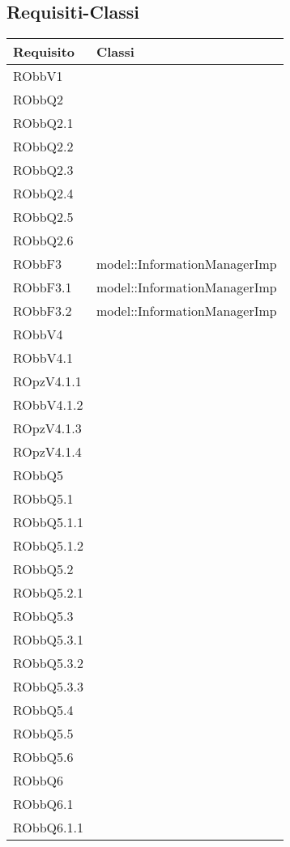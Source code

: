 \documentclass[../DefinizioneDiProdotto.tex]{subfiles}
\begin{document}
	\subsection{Requisiti-Classi}
\begin{longtabu}to \textwidth {X X}
\toprule
\textbf{Requisito} & \textbf{Classi}\\
\midrule
\endhead
{}
RObbV1 &  \\ 
\midrule 
RObbQ2 &  \\ 
\midrule 
RObbQ2.1 &  \\ 
\midrule 
RObbQ2.2 &  \\ 
\midrule 
RObbQ2.3 &  \\ 
\midrule 
RObbQ2.4 &  \\ 
\midrule 
RObbQ2.5 &  \\ 
\midrule 
RObbQ2.6 &  \\ 
\midrule 
RObbF3 & model::InformationManagerImp \\ 
\midrule 
RObbF3.1 & model::InformationManagerImp \\ 
\midrule 
RObbF3.2 & model::InformationManagerImp \\ 
\midrule 
RObbV4 &  \\ 
\midrule 
RObbV4.1 &  \\ 
\midrule 
ROpzV4.1.1 &  \\ 
\midrule 
RObbV4.1.2 &  \\ 
\midrule 
ROpzV4.1.3 &  \\ 
\midrule 
ROpzV4.1.4 &  \\ 
\midrule 
RObbQ5 &  \\ 
\midrule 
RObbQ5.1 &  \\ 
\midrule 
RObbQ5.1.1 &  \\ 
\midrule 
RObbQ5.1.2 &  \\ 
\midrule 
RObbQ5.2 &  \\ 
\midrule 
RObbQ5.2.1 &  \\ 
\midrule 
RObbQ5.3 &  \\ 
\midrule 
RObbQ5.3.1 &  \\ 
\midrule 
RObbQ5.3.2 &  \\ 
\midrule 
RObbQ5.3.3 &  \\ 
\midrule 
RObbQ5.4 &  \\ 
\midrule 
RObbQ5.5 &  \\ 
\midrule 
RObbQ5.6 &  \\ 
\midrule 
RObbQ6 &  \\ 
\midrule 
RObbQ6.1 &  \\ 
\midrule 
RObbQ6.1.1 &  \\ 

\end{longtabu}
\end{document}
